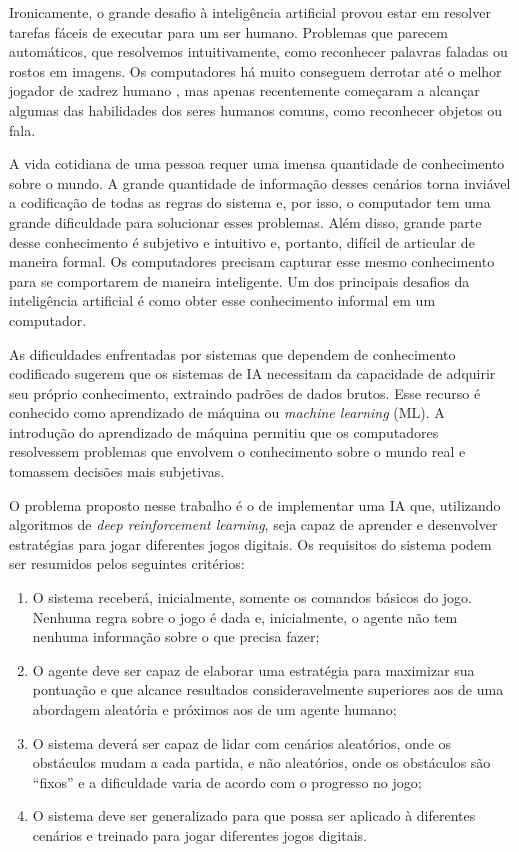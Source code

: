 Ironicamente, o grande desafio à inteligência artificial provou estar em resolver tarefas fáceis de executar para um ser humano. Problemas  que parecem automáticos, que resolvemos intuitivamente, como reconhecer palavras faladas ou rostos em imagens. Os computadores há muito conseguem derrotar até o melhor jogador de xadrez humano \cite{Hsu:2002:BDB:601291}, mas apenas recentemente começaram a alcançar algumas das habilidades dos seres humanos comuns, como reconhecer objetos ou fala. 

A vida cotidiana de uma pessoa requer uma imensa quantidade de conhecimento sobre o mundo. A grande quantidade de informação desses cenários torna inviável a codificação de todas as regras do sistema e, por isso, o computador tem uma grande dificuldade para solucionar esses problemas. Além disso, grande parte desse conhecimento é subjetivo e intuitivo e, portanto, difícil de articular de maneira formal. Os computadores precisam capturar esse mesmo conhecimento para se comportarem de maneira inteligente. Um dos principais desafios da inteligência artificial é como obter esse conhecimento informal em um computador.

As dificuldades enfrentadas por sistemas que dependem de conhecimento codificado sugerem que os sistemas de IA necessitam da capacidade de adquirir seu próprio conhecimento, extraindo padrões de dados brutos. Esse recurso é conhecido como aprendizado de máquina ou \textit{machine learning} (ML). A introdução do aprendizado de máquina permitiu que os computadores resolvessem problemas que envolvem o conhecimento sobre o mundo real e tomassem decisões mais subjetivas.


 O problema proposto nesse trabalho é o de implementar uma IA que, utilizando algoritmos de \textit{deep reinforcement learning}, seja capaz de aprender e desenvolver estratégias para jogar diferentes jogos digitais. Os requisitos do sistema podem ser resumidos pelos seguintes critérios:
\begin{enumerate}
	\item O sistema receberá, inicialmente, somente os comandos básicos do jogo. Nenhuma regra sobre o jogo é dada e, inicialmente, o agente não tem nenhuma informação sobre o que precisa fazer;

	\item O agente deve ser capaz de elaborar uma estratégia para maximizar sua pontuação e que alcance resultados consideravelmente superiores aos de uma abordagem aleatória e próximos aos de um agente humano;

	\item O sistema deverá ser capaz de lidar com cenários aleatórios, onde os obstáculos mudam a cada partida, e não aleatórios, onde os obstáculos são ``fixos'' e a dificuldade varia de acordo com o progresso no jogo;

	\item O sistema deve ser generalizado para que possa ser aplicado à diferentes cenários e treinado para jogar diferentes jogos digitais.
\end{enumerate}

